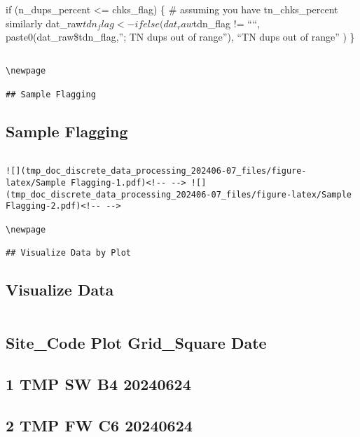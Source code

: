\documentclass[
]{article}
\begin{document}
if (n\_dups\_percent \textless= chks\_flag) \{ \# assuming you have
tn\_chks\_percent similarly
dat\_raw\(tdn_flag <- ifelse(  dat_raw\)tdn\_flag != ````,
paste0(dat\_raw\$tdn\_flag,''; TN dups out of range''), ``TN dups out of
range'' ) \}

\begin{verbatim}

\newpage

## Sample Flagging   
\end{verbatim}

\hypertarget{sample-flagging}{%
\subsection{Sample Flagging}\label{sample-flagging}}

\begin{verbatim}

![](tmp_doc_discrete_data_processing_202406-07_files/figure-latex/Sample Flagging-1.pdf)<!-- --> ![](tmp_doc_discrete_data_processing_202406-07_files/figure-latex/Sample Flagging-2.pdf)<!-- --> 

\newpage

## Visualize Data by Plot   
\end{verbatim}

\hypertarget{visualize-data}{%
\subsection{Visualize Data}\label{visualize-data}}

\begin{verbatim}
\end{verbatim}

\hypertarget{site_code-plot-grid_square-date}{%
\subsection{Site\_Code Plot Grid\_Square
Date}\label{site_code-plot-grid_square-date}}

\hypertarget{tmp-sw-b4-20240624}{%
\subsection{1 TMP SW B4 20240624}\label{tmp-sw-b4-20240624}}

\hypertarget{tmp-fw-c6-20240624}{%
\subsection{2 TMP FW C6 20240624}\label{tmp-fw-c6-20240624}}
\end{document}

